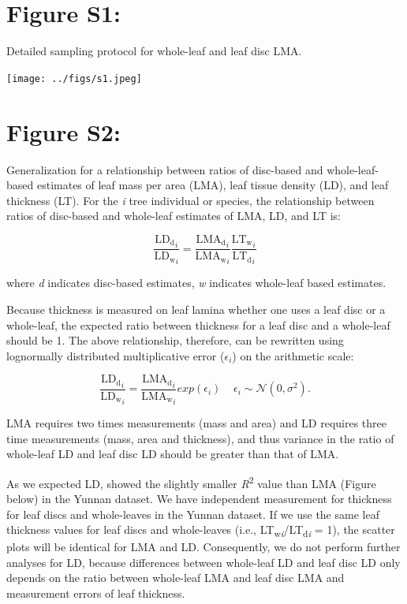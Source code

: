 \documentclass[
  12pt,
]{article}
\begin{document}
\newpage

\hypertarget{figure-s1}{%
\section{Figure S1:}\label{figure-s1}}

Detailed sampling protocol for whole-leaf and leaf disc LMA.

\begin{center}
\texttt{[image: ../figs/s1.jpeg]}

\end{center}

\newpage

\hypertarget{figure-s2}{%
\section{Figure S2:}\label{figure-s2}}

Generalization for a relationship between ratios of disc-based and whole-leaf-based estimates of leaf mass per area (LMA), leaf tissue density (LD), and leaf thickness (LT).
For the \emph{i} tree individual or species, the relationship between ratios of disc-based and whole-leaf estimates of LMA, LD, and LT is:

\[
\frac{\mathrm{LD_d}_i}{\mathrm{LD_w}_i} = \frac{\mathrm{LMA_d}_i}{\mathrm{LMA_w}_i} \frac{\mathrm{LT_w}_i}{\mathrm{LT_d}_i}
\]

where \emph{d} indicates disc-based estimates, \emph{w} indicates whole-leaf based estimates.

Because thickness is measured on leaf lamina whether one uses a leaf disc or a whole-leaf, the expected ratio between thickness for a leaf disc and a whole-leaf should be 1.
The above relationship, therefore, can be rewritten using lognormally distributed multiplicative error (\(\epsilon_i\)) on the arithmetic scale:

\[
\frac{\mathrm{LD_d}_i}{\mathrm{LD_w}_i} = \frac{\mathrm{LMA_d}_i}{\mathrm{LMA_w}_i} exp(\epsilon_i) \;\;\;\;\epsilon_i \sim \mathcal{N}(0, \sigma^2).
\]

LMA requires two times measurements (mass and area) and LD requires three time measurements (mass, area and thickness), and thus variance in the ratio of whole-leaf LD and leaf disc LD should be greater than that of LMA.

As we expected LD, showed the slightly smaller \emph{R}\textsuperscript{2} value than LMA (Figure below) in the Yunnan dataset.
We have independent measurement for thickness for leaf discs and whole-leaves in the Yunnan dataset.
If we use the same leaf thickness values for leaf discs and whole-leaves (i.e., LT\textsubscript{w\emph{i}}/LT\textsubscript{d\emph{i}} = 1), the scatter plots will be identical for LMA and LD.
Consequently, we do not perform further analyses for LD, because differences between whole-leaf LD and leaf disc LD only depends on the ratio between whole-leaf LMA and leaf disc LMA and measurement errors of leaf thickness.
\end{document}
